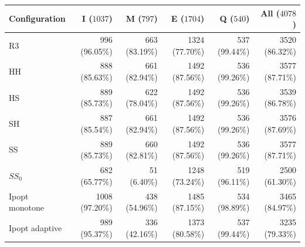 \begin{tabular}{@{}lrrrrr@{}}
\toprule
Configuration & I ($1037$) & M ($797$) & E ($1704$) & Q ($540$) & All ($4078$)\\
\midrule
R3 & 996 (96.05\%) & 663 (83.19\%) & 1324 (77.70\%) & 537 (99.44\%) & 3520 (86.32\%)\\
HH & 888 (85.63\%) & 661 (82.94\%) & 1492 (87.56\%) & 536 (99.26\%) & 3577 (87.71\%)\\
HS & 889 (85.73\%) & 622 (78.04\%) & 1492 (87.56\%) & 536 (99.26\%) & 3539 (86.78\%)\\
SH & 887 (85.54\%) & 661 (82.94\%) & 1492 (87.56\%) & 536 (99.26\%) & 3576 (87.69\%)\\
SS & 889 (85.73\%) & 660 (82.81\%) & 1492 (87.56\%) & 536 (99.26\%) & 3577 (87.71\%)\\
$SS_0$ & 682 (65.77\%) & 51 (6.40\%) & 1248 (73.24\%) & 519 (96.11\%) & 2500 (61.30\%)\\
Ipopt monotone & 1008 (97.20\%) & 438 (54.96\%) & 1485 (87.15\%) & 534 (98.89\%) & 3465 (84.97\%)\\
Ipopt adaptive & 989 (95.37\%) & 336 (42.16\%) & 1373 (80.58\%) & 537 (99.44\%) & 3235 (79.33\%)\\
\bottomrule
\end{tabular}
